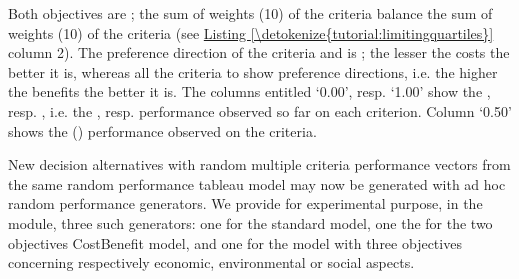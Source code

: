 \documentclass[a4paper,12pt,english]{sphinxhowto}
\begin{document}
\begin{sphinxVerbatim}[commandchars=\\\{\},numbers=left,firstnumber=1,stepnumber=1]
\end{sphinxVerbatim}

Both objectives are ; the sum of weights (10) of the  criteria balance the sum of weights (10) of the  criteria (see \hyperref[\detokenize{tutorial:limitingquartiles}]{Listing \ref{\detokenize{tutorial:limitingquartiles}}} column 2). The preference direction of the  criteria  and  is ; the lesser the costs the better it is, whereas all the  criteria  to  show  preference directions, i.e. the higher the benefits the better it is. The columns entitled ‘0.00’, resp. ‘1.00’ show the  , resp. , i.e. the , resp.  performance observed so far on each criterion. Column ‘0.50’ shows the  () performance observed on the criteria.

New  decision alternatives with random multiple criteria performance vectors from the same random performance tableau model may now be generated with ad hoc random performance generators. We provide for experimental purpose, in the  module, three such generators: one for the standard  model, one the for the two objectives  Cost\sphinxhyphen{}Benefit model, and one for the  model with three objectives concerning respectively  economic, environmental or social aspects.
\end{document}
